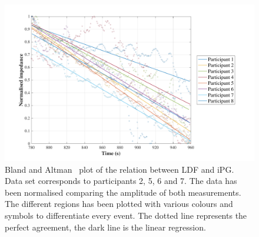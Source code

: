 \begin{figure}[!htpb]
	\includegraphics[width=1\textwidth,keepaspectratio]{figure4}    
	\caption[Bland and Altman plot of the relation between LDF and iPG]{Bland and Altman~\cite{bland1986statistical} plot of the relation between LDF and iPG. Data set corresponds to participants 2, 5, 6 and 7. The data has been normalised comparing the amplitude of both measurements. The different regions has been plotted with various colours and symbols to differentiate every event. The dotted line represents the perfect agreement, the dark line is the linear regression.}
	\label{fig:corr LDF}
\end{figure}

